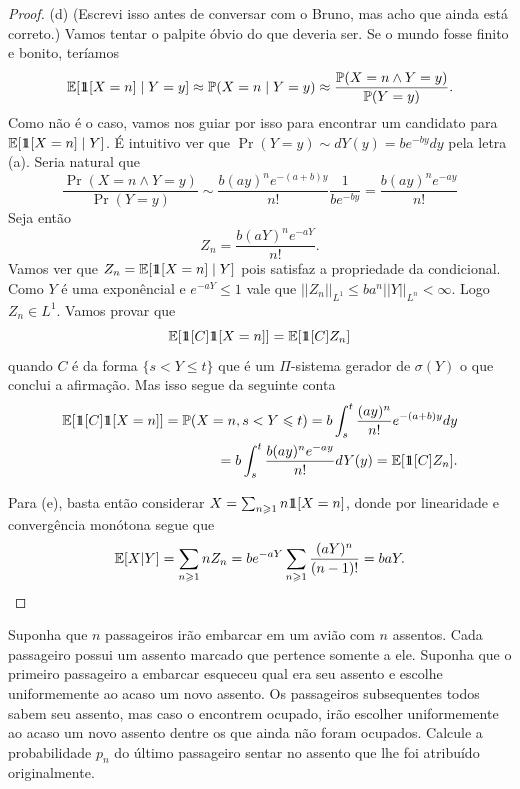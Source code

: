 \begin{proof}
	(d) (Escrevi isso antes de conversar com o Bruno, mas acho que ainda
	está correto.)
	Vamos tentar o palpite óbvio do que deveria ser. Se o
	mundo fosse finito e bonito, teríamos
	\[
		\mathbb{E}[\hbox{$1\mkern-6.5mu1$}[X = n] \mid Y = y] \approx \mathbb{P}(X = n \mid Y = y) \approx
		\frac{\mathbb{P}(X = n \land Y = y)}{\mathbb{P}(Y = y)}.
	\]
	Como não é o caso, vamos nos guiar por isso para encontrar um
	candidato para $\mathbb{E}[\hbox{$1\mkern-6.5mu1$}[X = n] \mid Y]$.
	É intuitivo ver que $\Pr(Y = y) \sim dY(y) = be^{-by}dy$ pela letra
	(a). Seria natural que
	\[
		\frac{\Pr(X = n \land Y = y)}{\Pr(Y = y)} \sim
		\frac{b(ay)^ne^{-(a+b)y}}{n!} \frac{1}{be^{-by}} = \frac{b(ay)^n e^{-ay}}{n!}
	\]
	Seja então
	\[
		Z_n = \frac{b(aY)^n e^{-aY}}{n!}.
	\]
	Vamos ver que $Z_n = \mathbb{E}[\hbox{$1\mkern-6.5mu1$}[X = n] \mid Y]$ pois satisfaz a
	propriedade da condicional. Como $Y$ é uma exponêncial
	e $e^{-aY} \leq 1$ vale que $||Z_n||_{L^1} \leq ba^n||Y||_{L^n} <
	\infty$. Logo $Z_n \in L^1$. Vamos provar que
	\[\mathbb{E}[\hbox{$1\mkern-6.5mu1$}[C] \hbox{$1\mkern-6.5mu1$}[X = n]] = \mathbb{E}[\hbox{$1\mkern-6.5mu1$}[C]Z_n]\]
	quando $C$ é da forma $\{s < Y \leq t\}$ que é um $\Pi$-sistema gerador
	de $\sigma(Y)$ o que conclui a afirmação.
	Mas isso segue da seguinte conta
	\begin{align*}
		\mathbb{E}[\hbox{$1\mkern-6.5mu1$}[C] \hbox{$1\mkern-6.5mu1$}[X = n]] = \mathbb{P}(X = n, s < Y \leqslant t) = b\int_s^t
		\frac{(ay)^n}{n!}e^{-(a+b)y}dy\\
		= b\int_s^t \frac{b(ay)^n e^{-ay}}{n!} dY(y) = \mathbb{E}[\hbox{$1\mkern-6.5mu1$}[C] Z_n].
	\end{align*}

	Para (e), basta então considerar $X = \sum_{n \geqslant 1} n\hbox{$1\mkern-6.5mu1$}[X = n]$,
	donde por linearidade e convergência monótona segue que
	\[
		\mathbb{E}[X | Y] = \sum_{n \geqslant 1} n Z_n = b e^{-aY}\sum_{n \geqslant 1}
		\frac{(aY)^n}{(n-1)!} = baY.
	\]
\end{proof}

\begin{exercise} [9]
	Suponha que $n$ passageiros irão embarcar em um avião com $n$
	assentos. Cada passageiro possui um assento marcado que pertence somente a ele.
	Suponha que o primeiro passageiro a embarcar esqueceu qual era seu
	assento e escolhe uniformemente ao acaso um novo assento. Os passageiros
	subsequentes todos sabem seu assento, mas caso o encontrem ocupado,
	irão escolher uniformemente ao acaso um novo assento dentre os que
	ainda não foram ocupados.
	Calcule a probabilidade $p_n$ do último passageiro sentar no assento
	que lhe foi atribuído originalmente.
\end{exercise}

